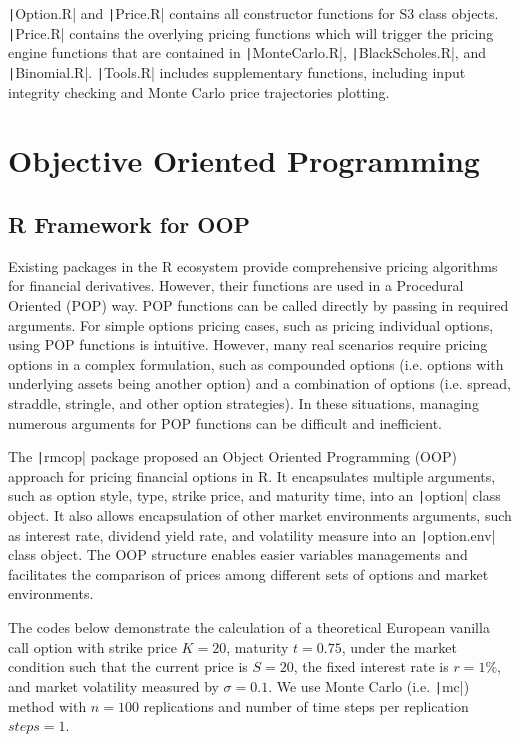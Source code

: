 \texttt|Option.R| and \texttt|Price.R| contains all constructor functions for S3 class objects. \texttt|Price.R| contains the overlying pricing functions which will trigger the pricing engine functions that are contained in \texttt|MonteCarlo.R|, \texttt|BlackScholes.R|, and \texttt|Binomial.R|. \texttt|Tools.R| includes supplementary functions, including input integrity checking and Monte Carlo price trajectories plotting.

\section{Objective Oriented Programming}

\subsection{R Framework for OOP}

Existing packages in the R ecosystem provide comprehensive pricing algorithms for financial derivatives. However, their functions are used in a Procedural Oriented (POP) way. POP functions can be called directly by passing in required arguments. For simple options pricing cases, such as pricing individual options, using POP functions is intuitive. However, many real scenarios require pricing options in a complex formulation, such as compounded options (i.e. options with underlying assets being another option) and a combination of options (i.e. spread, straddle, stringle, and other option strategies). In these situations, managing numerous arguments for POP functions can be difficult and inefficient.

The \texttt|rmcop| package proposed an Object Oriented Programming (OOP) approach for pricing financial options in R. It encapsulates multiple arguments, such as option style, type, strike price, and maturity time, into an \texttt|option| class object. It also allows encapsulation of other market environments arguments, such as interest rate, dividend yield rate, and volatility measure into an \texttt|option.env| class object. The OOP structure enables easier variables managements and facilitates the comparison of prices among different sets of options and market environments.

The codes below demonstrate the calculation of a theoretical European vanilla call option with strike price $K = 20$, maturity $t = 0.75$, under the market condition such that the current price is $S = 20$, the fixed interest rate is $r = 1\%$, and market volatility measured by $\sigma = 0.1$. We use Monte Carlo (i.e. \texttt|mc|) method with $n = 100$ replications and number of time steps per replication $steps = 1$.

